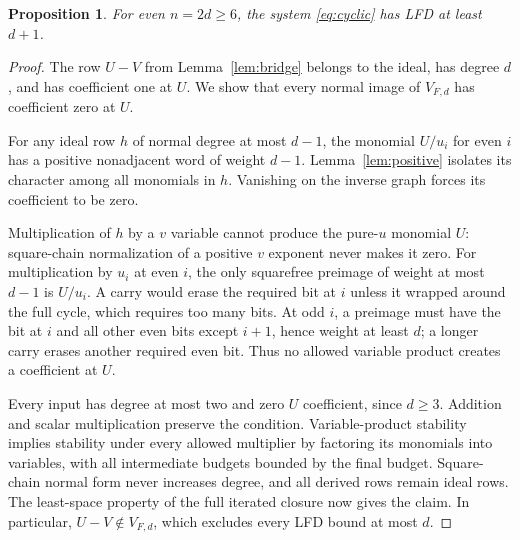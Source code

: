 \documentclass[11pt]{article}
\newtheorem{proposition}[theorem]{Proposition}
\theoremstyle{remark}\newtheorem{remark}[theorem]{Remark}
\begin{document}
\begin{proposition}\label{prop:lower}
For even $n=2d\ge6$, the system \eqref{eq:cyclic} has LFD at least $d+1$.
\end{proposition}
\begin{proof}
The row $U-V$ from Lemma~\ref{lem:bridge} belongs to the ideal, has degree
$d$, and has coefficient one at $U$. We show that every normal image of
$V_{F,d}$ has coefficient zero at $U$.

For any ideal row $h$ of normal degree at most $d-1$, the monomial
$U/u_i$ for even $i$ has a positive nonadjacent word of weight $d-1$.
Lemma~\ref{lem:positive} isolates its character among all monomials in
$h$. Vanishing on the inverse graph forces its coefficient to be zero.

Multiplication of $h$ by a $v$ variable cannot produce the pure-$u$
monomial $U$: square-chain normalization of a positive $v$ exponent
never makes it zero. For multiplication by $u_i$ at even $i$, the only
squarefree preimage of weight at most $d-1$ is $U/u_i$. A carry would
erase the required bit at $i$ unless it wrapped around the full cycle,
which requires too many bits. At odd $i$, a preimage must have the bit
at $i$ and all other even bits except $i+1$, hence weight at least $d$;
a longer carry erases another required even bit. Thus no allowed variable
product creates a coefficient at $U$.

Every input has degree at most two and zero $U$ coefficient, since $d\ge3$.
Addition and scalar multiplication preserve the condition. Variable-product
stability implies stability under every allowed multiplier by factoring
its monomials into variables, with all intermediate budgets bounded by
the final budget. Square-chain normal form never increases degree, and
all derived rows remain ideal rows. The least-space property of the full
iterated closure now gives the claim. In particular, $U-V\notin V_{F,d}$,
which excludes every LFD bound at most $d$.
\end{proof}
\end{document}
